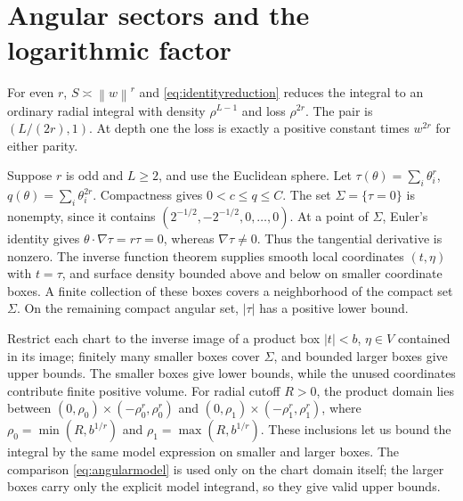 \documentclass[11pt,letterpaper]{amsart}
\theoremstyle{scplain}
\newcommand{\asym}{\asymp}
\newcommand{\norm}[1]{\left\lVert#1\right\rVert}
\begin{document}
\section{Angular sectors and the logarithmic factor}\label{app:sectors}
For even $r$, $S\asym\norm{w}^r$ and \eqref{eq:identityreduction} reduces the integral to an ordinary radial integral with density $\rho^{L-1}$ and loss $\rho^{2r}$. The pair is $(L/(2r),1)$. At depth one the loss is exactly a positive constant times $w^{2r}$ for either parity.

Suppose $r$ is odd and $L\ge2$, and use the Euclidean sphere. Let $\tau(\theta)=\sum_i\theta_i^r$, $q(\theta)=\sum_i\theta_i^{2r}$. Compactness gives $0<c\le q\le C$. The set $\Sigma=\{\tau=0\}$ is nonempty, since it contains $(2^{-1/2},-2^{-1/2},0,\ldots,0)$. At a point of $\Sigma$, Euler's identity gives $\theta\cdot\nabla\tau=r\tau=0$, whereas $\nabla\tau\ne0$. Thus the tangential derivative is nonzero. The inverse function theorem supplies smooth local coordinates $(t,\eta)$ with $t=\tau$, and surface density bounded above and below on smaller coordinate boxes. A finite collection of these boxes covers a neighborhood of the compact set $\Sigma$. On the remaining compact angular set, $|\tau|$ has a positive lower bound.

Restrict each chart to the inverse image of a product box $|t|<b$, $\eta\in V$ contained in its image; finitely many smaller boxes cover $\Sigma$, and bounded larger boxes give upper bounds. The smaller boxes give lower bounds, while the unused coordinates contribute finite positive volume. For radial cutoff $R>0$, the product domain lies between $(0,\rho_0)\times(-\rho_0^r,\rho_0^r)$ and $(0,\rho_1)\times(-\rho_1^r,\rho_1^r)$, where $\rho_0=\min(R,b^{1/r})$ and $\rho_1=\max(R,b^{1/r})$. These inclusions let us bound the integral by the same model expression on smaller and larger boxes. The comparison \eqref{eq:angularmodel} is used only on the chart domain itself; the larger boxes carry only the explicit model integrand, so they give valid upper bounds.
\end{document}
